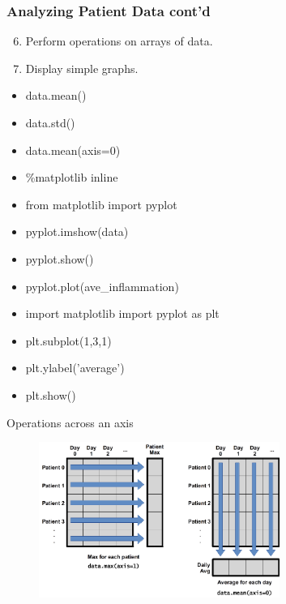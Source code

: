 \documentclass{beamer}
\begin{document}
\begin{frame}
\frametitle{Analyzing Patient Data cont'd}
\begin{enumerate}
\setcounter{enumi}{5}
\item    Perform operations on arrays of data.
\item    Display simple graphs.
\end{enumerate}
\begin{multicols}{2}
\begin{itemize}
\item data.mean()
\item data.std()
\item data.mean(axis=0)
\item \%matplotlib inline
\item from matplotlib import pyplot
\item pyplot.imshow(data)
\item pyplot.show()
\item pyplot.plot(ave\_inflammation)
\item import matplotlib import pyplot as plt
\item plt.subplot(1,3,1)
\item plt.ylabel('average')
\item plt.show()
\end{itemize}
\end{multicols}
\end{frame}





\begin{frame}{Operations across an axis}

\begin{figure}[htbp]
   \centering
  \includegraphics[width=0.7\textwidth]{figs_slides/python-operations-across-axes.png} 
\end{figure}

\end{frame}
\end{document}
